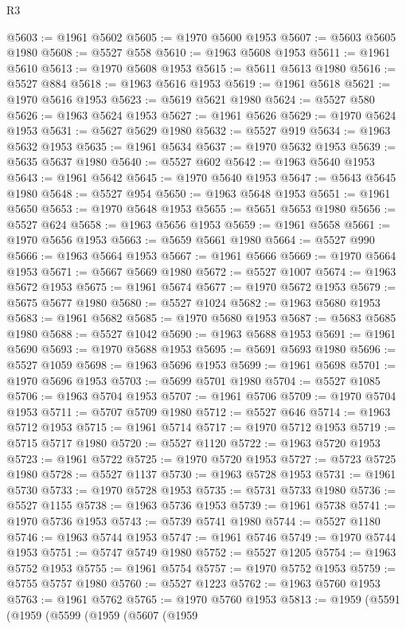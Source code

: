 \begin{lexlean}{R3}
\begin{coremodule}
@5603 := @1961 @5602
@5605 := @1970 @5600 @1953
@5607 := @5603 @5605 @1980
@5608 := @5527 @558
@5610 := @1963 @5608 @1953
@5611 := @1961 @5610
@5613 := @1970 @5608 @1953
@5615 := @5611 @5613 @1980
@5616 := @5527 @884
@5618 := @1963 @5616 @1953
@5619 := @1961 @5618
@5621 := @1970 @5616 @1953
@5623 := @5619 @5621 @1980
@5624 := @5527 @580
@5626 := @1963 @5624 @1953
@5627 := @1961 @5626
@5629 := @1970 @5624 @1953
@5631 := @5627 @5629 @1980
@5632 := @5527 @919
@5634 := @1963 @5632 @1953
@5635 := @1961 @5634
@5637 := @1970 @5632 @1953
@5639 := @5635 @5637 @1980
@5640 := @5527 @602
@5642 := @1963 @5640 @1953
@5643 := @1961 @5642
@5645 := @1970 @5640 @1953
@5647 := @5643 @5645 @1980
@5648 := @5527 @954
@5650 := @1963 @5648 @1953
@5651 := @1961 @5650
@5653 := @1970 @5648 @1953
@5655 := @5651 @5653 @1980
@5656 := @5527 @624
@5658 := @1963 @5656 @1953
@5659 := @1961 @5658
@5661 := @1970 @5656 @1953
@5663 := @5659 @5661 @1980
@5664 := @5527 @990
@5666 := @1963 @5664 @1953
@5667 := @1961 @5666
@5669 := @1970 @5664 @1953
@5671 := @5667 @5669 @1980
@5672 := @5527 @1007
@5674 := @1963 @5672 @1953
@5675 := @1961 @5674
@5677 := @1970 @5672 @1953
@5679 := @5675 @5677 @1980
@5680 := @5527 @1024
@5682 := @1963 @5680 @1953
@5683 := @1961 @5682
@5685 := @1970 @5680 @1953
@5687 := @5683 @5685 @1980
@5688 := @5527 @1042
@5690 := @1963 @5688 @1953
@5691 := @1961 @5690
@5693 := @1970 @5688 @1953
@5695 := @5691 @5693 @1980
@5696 := @5527 @1059
@5698 := @1963 @5696 @1953
@5699 := @1961 @5698
@5701 := @1970 @5696 @1953
@5703 := @5699 @5701 @1980
@5704 := @5527 @1085
@5706 := @1963 @5704 @1953
@5707 := @1961 @5706
@5709 := @1970 @5704 @1953
@5711 := @5707 @5709 @1980
@5712 := @5527 @646
@5714 := @1963 @5712 @1953
@5715 := @1961 @5714
@5717 := @1970 @5712 @1953
@5719 := @5715 @5717 @1980
@5720 := @5527 @1120
@5722 := @1963 @5720 @1953
@5723 := @1961 @5722
@5725 := @1970 @5720 @1953
@5727 := @5723 @5725 @1980
@5728 := @5527 @1137
@5730 := @1963 @5728 @1953
@5731 := @1961 @5730
@5733 := @1970 @5728 @1953
@5735 := @5731 @5733 @1980
@5736 := @5527 @1155
@5738 := @1963 @5736 @1953
@5739 := @1961 @5738
@5741 := @1970 @5736 @1953
@5743 := @5739 @5741 @1980
@5744 := @5527 @1180
@5746 := @1963 @5744 @1953
@5747 := @1961 @5746
@5749 := @1970 @5744 @1953
@5751 := @5747 @5749 @1980
@5752 := @5527 @1205
@5754 := @1963 @5752 @1953
@5755 := @1961 @5754
@5757 := @1970 @5752 @1953
@5759 := @5755 @5757 @1980
@5760 := @5527 @1223
@5762 := @1963 @5760 @1953
@5763 := @1961 @5762
@5765 := @1970 @5760 @1953
@5813 := @1959
    (@5591
      (@1959
        (@5599
          (@1959
            (@5607
              (@1959

\end{coremodule}
\end{lexlean}

